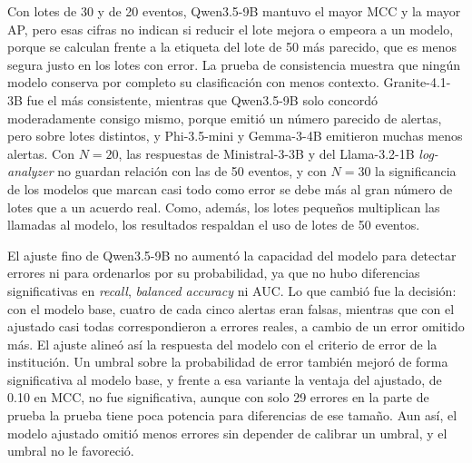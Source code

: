 Con lotes de 30 y de 20 eventos, Qwen3.5-9B mantuvo el mayor MCC y la mayor AP, pero esas cifras no indican si reducir el lote mejora o empeora a un modelo, porque se calculan frente a la etiqueta del lote de 50 más parecido, que es menos segura justo en los lotes con error. La prueba de consistencia muestra que ningún modelo conserva por completo su clasificación con menos contexto. Granite-4.1-3B fue el más consistente, mientras que Qwen3.5-9B solo concordó moderadamente consigo mismo, porque emitió un número parecido de alertas, pero sobre lotes distintos, y Phi-3.5-mini y Gemma-3-4B emitieron muchas menos alertas. Con $N = 20$, las respuestas de Ministral-3-3B y del Llama-3.2-1B \textit{log-analyzer} no guardan relación con las de 50 eventos, y con $N = 30$ la significancia de los modelos que marcan casi todo como error se debe más al gran número de lotes que a un acuerdo real. Como, además, los lotes pequeños multiplican las llamadas al modelo, los resultados respaldan el uso de lotes de 50 eventos.

El ajuste fino de Qwen3.5-9B no aumentó la capacidad del modelo para detectar errores ni para ordenarlos por su probabilidad, ya que no hubo diferencias significativas en \textit{recall}, \textit{balanced accuracy} ni AUC. Lo que cambió fue la decisión: con el modelo base, cuatro de cada cinco alertas eran falsas, mientras que con el ajustado casi todas correspondieron a errores reales, a cambio de un error omitido más. El ajuste alineó así la respuesta del modelo con el criterio de error de la institución. Un umbral sobre la probabilidad de error también mejoró de forma significativa al modelo base, y frente a esa variante la ventaja del ajustado, de 0.10 en MCC, no fue significativa, aunque con solo 29 errores en la parte de prueba la prueba tiene poca potencia para diferencias de ese tamaño. Aun así, el modelo ajustado omitió menos errores sin depender de calibrar un umbral, y el umbral no le favoreció.

